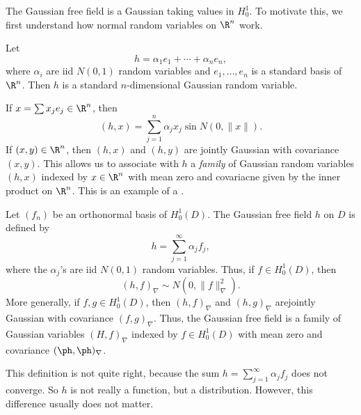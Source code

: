 \documentclass[a4paper]{article}
\begin{document}
The Gaussian free field is a Gaussian taking values in $H_0^1$. To motivate this, we first understand how normal random variables on $\R^n$ work.

Let
\[
  h = \alpha_1 e_1 + \cdots + \alpha_n e_n,
\]
where $\alpha_i$ are iid $N(0, 1)$ random variables and $e_1, \ldots, e_n$ is a standard basis of $\R^n$. Then $h$ is a standard $n$-dimensional Gaussian random variable.

If $x = \sum x_j e_j \in \R^n$, then
\[
  (h, x) = \sum_{j = 1}^n \alpha_j x_j \sin N(0, \|x\|).
\]
If $(x, y) \in \R^n$, then $(h, x)$ and $(h, y)$ are jointly Gaussian with covariance $(x, y)$. This allows us to associate with $h$ a \emph{family} of Gaussian random variables $(h, x)$ indexed by $x \in \R^n$ with mean zero and covariacne given by the inner product on $\R^n$. This is an example of a .

Let $(f_n)$ be an orthonormal basis of $H_0^1(D)$. The Gaussian free field $h$ on $D$ is defined by
\[
  h = \sum_{j = 1}^\infty \alpha_j f_j,
\]
where the $\alpha_j$'s are iid $N(0, 1)$ random variables. Thus, if $f \in H_0^1(D)$, then
\[
  (h, f)_\nabla \sim N(0, \|f\|_\nabla^2).
\]
More generally, if $f, g \in H_0^1(D)$, then $(h, f)_\nabla$ and $(h, g)_\nabla$ arejointly Gaussian with covariance $(f, g)_\nabla$. Thus, the Gaussian free field is a family of Gaussian variables $(H, f)_\nabla$ indexed by $f \in H_0^1(D)$ with mean zero and covariance $(\ph, \ph)_\nabla$.

This definition is not quite right, because the sum $h = \sum_{j = 1}^\infty \alpha_j f_j$ does not converge. So $h$ is not really a function, but a distribution. However, this difference usually does not matter.
\end{document}
